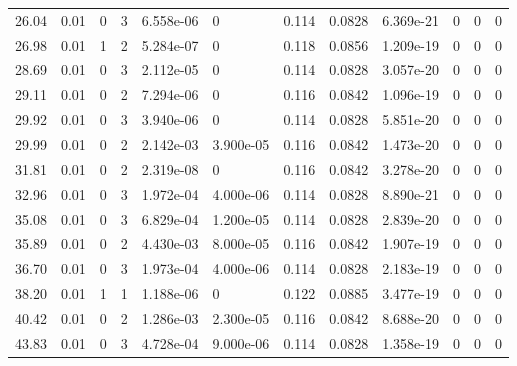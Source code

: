 \documentclass[preview]{standalone}
\begin{document}
{{\begin{tabular}{L{1.2cm}C{1.2cm} C{0.3cm}C{0.5cm} C{1.4cm}C{1.4cm} C{1.4cm}C{1.4cm} C{1.6cm}C{1.6cm} C{1.6cm}C{1.6cm}}
  26.04  &  0.01  & 0     &  3 &  6.558e-06  & 0  &  0.114&   0.0828& 6.369e-21 & 0   &  0 & 0  \\ 
  26.98  &  0.01  & 1     &  2 &  5.284e-07  & 0  &  0.118&   0.0856& 1.209e-19 & 0   &  0 & 0  \\ 
  28.69  &  0.01  & 0     &  3 &  2.112e-05  & 0  &  0.114&   0.0828& 3.057e-20 & 0   &  0 & 0  \\ 
  29.11  &  0.01  & 0     &  2 &  7.294e-06  & 0  &  0.116&   0.0842& 1.096e-19 & 0   &  0 & 0  \\ 
  29.92  &  0.01  & 0     &  3 &  3.940e-06  & 0  &  0.114&   0.0828& 5.851e-20 & 0   &  0 & 0  \\ 
  29.99  &  0.01  & 0     &  2 &  2.142e-03  & 3.900e-05  &  0.116&   0.0842& 1.473e-20 & 0   &  0 & 0  \\ 
  31.81  &  0.01  & 0     &  2 &  2.319e-08  & 0  &  0.116&   0.0842& 3.278e-20 & 0   &  0 & 0  \\ 
  32.96  &  0.01  & 0     &  3 &  1.972e-04  & 4.000e-06  &  0.114&   0.0828& 8.890e-21 & 0   &  0 & 0  \\ 
  35.08  &  0.01  & 0     &  3 &  6.829e-04  & 1.200e-05  &  0.114&   0.0828& 2.839e-20 & 0   &  0 & 0  \\ 
  35.89  &  0.01  & 0     &  2 &  4.430e-03  & 8.000e-05  &  0.116&   0.0842& 1.907e-19 & 0   &  0 & 0  \\ 
  36.70  &  0.01  & 0     &  3 &  1.973e-04  & 4.000e-06  &  0.114&   0.0828& 2.183e-19 & 0   &  0 & 0  \\ 
  38.20  &  0.01  & 1     &  1 &  1.188e-06  & 0  &  0.122&   0.0885& 3.477e-19 & 0   &  0 & 0  \\ 
  40.42  &  0.01  & 0     &  2 &  1.286e-03  & 2.300e-05  &  0.116&   0.0842& 8.688e-20 & 0   &  0 & 0  \\ 
  43.83  &  0.01  & 0     &  3 &  4.728e-04  & 9.000e-06  &  0.114&   0.0828& 1.358e-19 & 0   &  0 & 0  \\ 
\hline 
\end{tabular} 

}}
\end{document}
